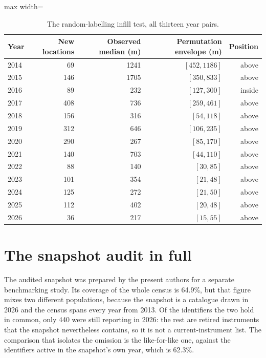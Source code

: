 \documentclass[fleqn,10pt]{wlpeerj}
\begin{document}
\begin{table}[H]
\centering
\caption{The random-labelling infill test, all thirteen year pairs.}
\label{si:infillrl}
\small
\begin{adjustbox}{max width=\linewidth}
\begin{tabular}{lrrrr}
\toprule
Year & New locations & Observed median (m) & Permutation envelope (m) & Position \\
\midrule
2014 & 69 & 1241 & $[452, 1186]$ & above \\
2015 & 146 & 1705 & $[350, 833]$ & above \\
2016 & 89 & 232 & $[127, 300]$ & inside \\
2017 & 408 & 736 & $[259, 461]$ & above \\
2018 & 156 & 316 & $[54, 118]$ & above \\
2019 & 312 & 646 & $[106, 235]$ & above \\
2020 & 290 & 267 & $[85, 170]$ & above \\
2021 & 140 & 703 & $[44, 110]$ & above \\
2022 & 88 & 140 & $[30, 85]$ & above \\
2023 & 101 & 354 & $[21, 48]$ & above \\
2024 & 125 & 272 & $[21, 50]$ & above \\
2025 & 112 & 402 & $[20, 48]$ & above \\
2026 & 36 & 217 & $[15, 55]$ & above \\
\bottomrule
\end{tabular}
\end{adjustbox}
\end{table}

\section{The snapshot audit in full}
\label{si:snapshot}

The audited snapshot was prepared by the present authors for a separate benchmarking study. Its
coverage of the whole census is 64.9\%, but that figure mixes two different populations, because
the snapshot is a catalogue drawn in 2026 and the census spans every year from 2013. Of the
identifiers the two hold in common, only 440 were still reporting in 2026: the rest are retired
instruments that the snapshot nevertheless contains, so it is not a current-instrument list.
The comparison that isolates the omission is the like-for-like one, against the identifiers
active in the snapshot's own year, which is 62.3\%.
\end{document}
